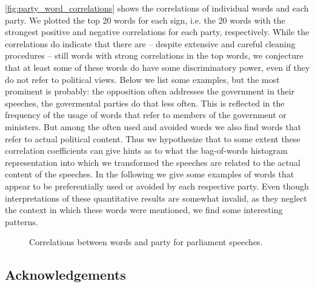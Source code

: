 \documentclass[runningheads,a4paper]{llncs}
\begin{document}
\autoref{fig:party_word_correlations} shows the correlations of individual words and each party. We plotted the top 20 words for each sign, i.e. the 20 words with the strongest positive and negative correlations for each party, respectively. While the correlations do indicate that there are -- despite extensive and careful cleaning procedures -- still words with strong correlations in the top words, we conjecture that at least some of these words do have some discriminatory power, even if they do not refer to political views. Below we list some examples, but the most prominent is probably: the opposition often addresses the government in their speeches, the govermental parties do that less often. This is reflected in the frequency of the usage of words that refer to members of the government or ministers. But among the often used and avoided words we also find words that refer to actual political content. Thus we hypothesize that to some extent these correlation coefficients can give hints as to what the bag-of-words histogram representation into which we transformed the speeches are related to the actual content of the speeches. In the following we give some examples of words that appear to be preferentially used or avoided by each respective party. Even though interpretations of these quantitative results are somewhat invalid, as they neglect the context in which these words were mentioned, we find some interesting patterns. 

\begin{figure}
\begin{center}
%
\end{center}
\caption{
\label{fig:party_word_correlations}
Correlations between words and party for parliament speeches. }
\end{figure}


\small
\subsection*{Acknowledgements}

%
\small{

 
}
\end{document}
